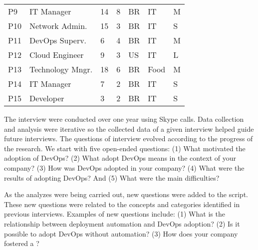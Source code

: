 \begin{table}[t]
\begin{tabular}{|p{0.4cm}|p{2.6cm}|p{0.4cm}|p{0.45cm}|p{0.5cm}|p{1.3cm}|p{0.3cm}|}
P9                   & IT Manager            & 14           & 8           & BR            & IT                 & M                               \\ \centering

P10                  & Network Admin.        & 15           & 3           & BR            & IT                 & S                               \\ \centering

P11                  & DevOps Superv.                & 6            & 4           & BR            & IT                  & M                               \\ \centering

P12                  & Cloud Engineer              & 9            & 3           & US            & IT                  & L                               \\ \centering

P13                  & Technology Mngr.                 & 18            & 6           & BR            & Food                  & M                               \\ \centering

P14                  & IT Manager            & 7            & 2           & BR            & IT                  & S                               \\ \centering

P15                  & Developer        & 3            & 2           & BR            & IT                  & S \\ \bottomrule
\end{tabular}
\end{table}



The interview were conducted over one year using Skype calls.
Data collection and analysis were iterative so the collected data of a given interview helped guide
future interviews. The questions of interview evolved according to
the progress of the research. We start with five open-ended questions: (1) What
motivated the adoption of DevOps? (2) What adopt DevOps means in the context of
your company? (3) How was DevOps adopted in your company? (4) What were the
results of adopting DevOps? And (5) What were the main difficulties?

As the analyzes were being carried out, new questions were added to the script.
These new questions were related to the concepts and categories identified in
previous interviews. Examples of new questions include: (1) What is the
relationship between deployment automation and DevOps adoption? (2) Is it
possible to adopt DevOps without automation? (3) How does your company fostered a \cc?

